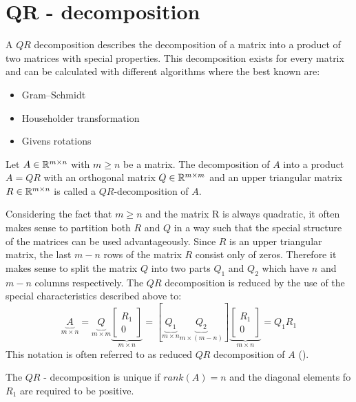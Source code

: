 \section{QR - decomposition}

A $QR$ decomposition describes the decomposition of a matrix into a product of two matrices with special properties. This decomposition exists for every matrix and can be calculated with different algorithms where the best known are:

\begin{itemize}
	\item Gram–Schmidt
	\item Householder transformation
	\item Givens rotations
\end{itemize}

\begin{definition}
	Let $A \in \mathbb{R}^{m \times n}$ with $m \geq n$ be a matrix. The decomposition of $A$ into a product $A = QR$ with an orthogonal matrix $Q \in \mathbb{R}^{m \times m}$ and an upper triangular matrix $R \in \mathbb{R}^{m \times n}$ is called a $QR$-decomposition of $A$. 
\end{definition}

Considering the fact that $m \geq n$ and the matrix R is always quadratic, it often makes sense to partition both $R$ and $Q$ in a way such that the special structure of the matrices can be used advantageously. Since $R$ is an upper triangular matrix, the last $m-n$ rows of the matrix $R$ consist only of zeros. Therefore it makes sense to split the matrix $Q$ into two parts $Q_1$ and $Q_2$ which have $n$ and $m-n$ columns respectively. The $QR$ decomposition is reduced by the use of the special characteristics described above to:
\begin{equation}\label{equ:thin_QR}
	\underbrace{A}_{m \times n} =  \underbrace{Q}_{m \times m} \underbrace{\begin{bmatrix} R_1 \\ 0 \end{bmatrix}}_{m \times n} = [\underbrace{Q_1}_{m \times n} \underbrace{Q_2}_{m \times (m-n)} ]  \underbrace{\begin{bmatrix} R_1 \\ 0 \end{bmatrix}}_{m \times n} = Q_1 R_1
\end{equation}
This notation is often referred to as reduced $QR$ decomposition of $A$ (\cite{trefethen1997numerical}).

\begin{remark} The $QR$ - decomposition is unique if $rank(A) = n$ and the diagonal elements fo $R_1$ are required to be positive.
\end{remark}

